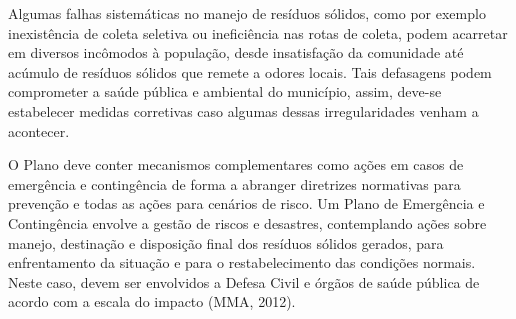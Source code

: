 \begin{comment}
	Risco socioambiental:
	
	
	Áreas com histórico anterior de desabamentos/enchentes;
	
	
	Populações que vivem em encostas e próximos a cursos d’água;
	
	
	Adensamentos populacionais (favelas, ocupações);
	
	
	Mapas de risco social, quando disponível.
	
	Riscos associados aos resíduos sólidos:
	
	
	Levantamento de situações e pontos críticos referentes a acidentes e vazamentos ou disposição de resíduos perigosos;
	
	
	Mapeamento de situações de fragilidade e planos de possíveis ações emergenciais e de contingência no transporte e disposição de resíduos sólidos domiciliares e de varrição e resíduos industriais;
	
	
	Identificação de áreas com baixa cobertura de coleta ou com estrutura de limpeza pública (sistema de coleta) ausente;
	
	
	Identificação de sistemas de disposição final de resíduos urbanos (lixão, aterros, áreas de transbordo) que possam acarretar riscos químicos e biológicos;
	
	
	Identificação de áreas potenciais para proliferação de vetores e abrigos de animais peçonhentos, e associação com os mapeamentos de riscos existentes.
	Os levantamentos das condições ambientais de áreas afetadas, de risco socioambiental e de riscos associados aos resíduos sólidos devem ser elaborados em um planejamento detalhado, para orientar as tomadas de decisões e ações emergenciais em caso de contingência dos serviços.
	
	
	\end{comment}
	


	Algumas falhas sistemáticas no manejo de resíduos sólidos, como por exemplo inexistência de coleta seletiva ou ineficiência nas rotas de coleta, podem acarretar em diversos incômodos à população, desde insatisfação da comunidade até acúmulo de resíduos sólidos que remete a odores locais. Tais defasagens podem comprometer a saúde pública e ambiental do município, assim, deve-se estabelecer medidas corretivas caso algumas dessas irregularidades venham a acontecer. 
	
	O Plano deve conter mecanismos complementares como ações em casos de emergência e contingência de forma a abranger diretrizes normativas para prevenção e todas as ações para cenários de risco. Um Plano de Emergência e Contingência envolve a gestão de riscos e desastres, contemplando ações sobre manejo, destinação e disposição final dos resíduos sólidos gerados, para enfrentamento da situação e para o restabelecimento das condições normais. Neste caso, devem ser envolvidos a Defesa Civil e órgãos de saúde pública de acordo com a escala do impacto (MMA, 2012).
	
